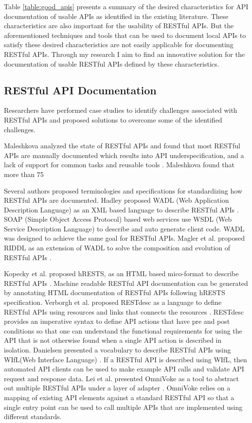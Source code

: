 \documentclass[11pt,oneside]{book}
\begin{document}
Table \ref{table:good_apis} presents a summary of the desired characteristics for API documentation of usable APIs as identified in the existing literature. These characteristics are also important for the usability of RESTful APIs. But the aforementioned techniques and tools that can be used to document local APIs to satisfy these desired characteristics are not easily applicable for documenting RESTful APIs. Through my research I aim to find an innovative solution for the documentation of usable RESTful APIs defined by these characteristics.

\subsection{RESTful API Documentation} %
Researchers have performed case studies to identify challenges associated with RESTful APIs and proposed solutions to overcome some of the identified challenges.

Maleshkova analyzed the state of RESTful APIs and found that most RESTful APIs are manually documented which results into API underspecification, and a lack of support for common tasks and reusable tools \cite{Maleshkova_investigating}. Maleshkova found that more than 75%

Several authors proposed terminologies and specifications for standardizing how RESTful APIs are documented. Hadley proposed WADL (Web Application Description Language) as an XML based language to describe RESTful APIs \cite{hadley2006web}. SOAP (Simple Object Access Protocol) based web services use WSDL (Web Service Description Language) to describe and auto generate client code. WADL was designed to achieve the same goal for RESTful APIs. Magler et al. proposed RIDDL as an extension of WADL to solve the composition and evolution of RESTful APIs \cite{mangler2010origin}.

Kopecky et al. proposed hRESTS, as an HTML based mico-format to describe RESTful APIs \cite{Kopecky_hrests}. Machine readable RESTful API documentation can be generated by annotating HTML documentation of RESTful APIs following hRESTS specification. Verborgh et al. proposed RESTdesc as a language to define RESTful APIs using resources and links that connects the resources \cite{RESTdesc}. RESTdesc provides an imperative syntax to define API actions that have pre and post conditions so that one can understand the functional requirements for using the API that is not otherwise found when a single API action is described in isolation. Danielsen presented a vocabulary to describe RESTful APIs using WIfL(Web Interface Language) \cite{Danielsen_validation}. If a RESTful API is described using WIfL, then automated API clients can be used to make  example API calls and validate API request and response data. Lei et al. presented OmniVoke as a tool to abstract out multiple RESTful APIs under a layer of adapter \cite{Ning_omnivoke}. OmniVoke relies on a mapping of existing API elements against a standard RESTful API so that a single entry point can be used to call multiple APIs that are implemented using different standards.
\end{document}
